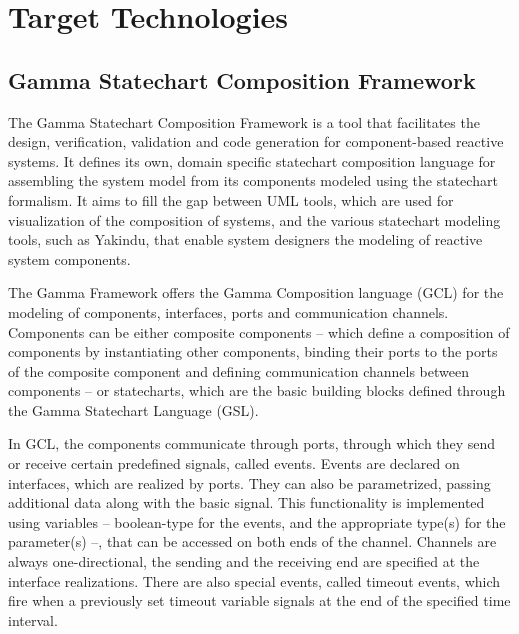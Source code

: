 \section{Target Technologies} \label{section_background_target}

\subsection{Gamma Statechart Composition Framework} \label{subsection_background_target_gamma}
The Gamma Statechart Composition Framework \cite{GammaVince2018} is a tool that facilitates the design, verification, validation and code generation for component-based reactive systems. It defines its own, domain specific statechart composition language for assembling the system model from its components modeled using the statechart formalism. It aims to fill the gap between UML tools, which are used for visualization of the composition of systems, and the various statechart modeling tools, such as Yakindu, that enable system designers the modeling of reactive system components.

The Gamma Framework offers the Gamma Composition language (GCL) for the modeling of components, interfaces, ports and communication channels. Components can be either composite components -- which define a composition of components by instantiating other components, binding their ports to the ports of the composite component and defining communication channels between components -- or statecharts, which are the basic building blocks defined through the Gamma Statechart Language (GSL).

In GCL, the components communicate through ports, through which they send or receive certain predefined signals, called events. Events are declared on interfaces, which are realized by ports. They can also be parametrized, passing additional data along with the basic signal. This functionality is implemented using variables -- boolean-type for the events, and the appropriate type(s) for the parameter(s) --, that can be accessed on both ends of the channel. Channels are always one-directional, the sending and the receiving end are specified at the interface realizations.
There are also special events, called timeout events, which fire when a previously set timeout variable signals at the end of the specified time interval. 

